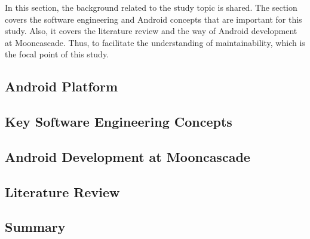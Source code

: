 In this section, the background related to the study topic is shared. The section covers the software engineering and Android concepts that are important for this study. Also, it covers the literature review and the way of Android development at Mooncascade. Thus, to facilitate the understanding of maintainability, which is the focal point of this study.

\subsection{Android Platform}


\subsection{Key Software Engineering Concepts}


\subsection{Android Development at Mooncascade}
\label{section:2.3}


\subsection{Literature Review}


\subsection{Summary}




